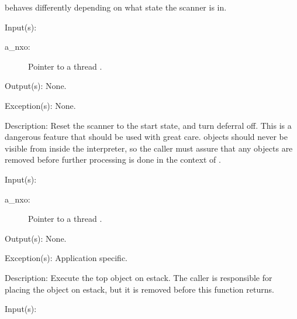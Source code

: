 \begin{capi}
\begin{capilist}
		behaves differently depending on what state the scanner is in.
	\end{capilist}
\label{nxo_thread_reset}
	\begin{capilist}
	\item[Input(s): ]
		\begin{description}\item[]
		\item[a\_nxo: ]
			Pointer to a thread .
		\end{description}
	\item[Output(s): ] None.
	\item[Exception(s): ] None.
	\item[Description: ]
		Reset the scanner to the start state, and turn deferral off.
		This is a dangerous feature that should be used with great
		care.   objects should never be visible from
		inside the interpreter, so the caller must assure that any
		 objects are removed before further
		processing is done in the context of .
	\end{capilist}
\label{nxo_thread_loop}
	\begin{capilist}
	\item[Input(s): ]
		\begin{description}\item[]
		\item[a\_nxo: ]
			Pointer to a thread \classname{nxo}.
		\end{description}
	\item[Output(s): ] None.
	\item[Exception(s): ] Application specific.
	\item[Description: ]
		Execute the top object on estack.  The caller is responsible
		for placing the object on estack, but it is removed before this
		function returns.
	\end{capilist}
\label{nxo_thread_interpret}
	\begin{capilist}
	\item[Input(s): ]
		\begin{description}\item[]

\end{description}
\end{capilist}
\end{capi}
